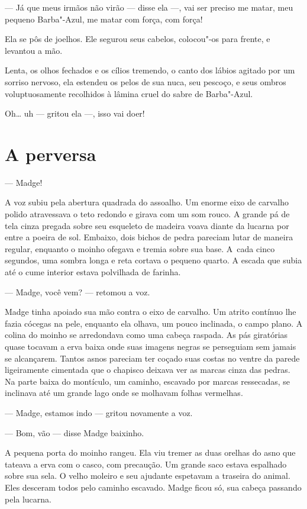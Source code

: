 --- Já que meus irmãos não virão --- disse ela ---, vai ser preciso me matar,
meu pequeno Barba"-Azul, me matar com força, com força!

Ela se pôs de joelhos. Ele segurou seus cabelos, colocou"-os para
frente, e levantou a mão.

Lenta, os olhos fechados e os cílios tremendo, o canto dos lábios
agitado por um sorriso nervoso, ela estendeu os pelos de sua nuca, seu
pescoço, e seus ombros voluptuosamente recolhidos à lâmina cruel do sabre de
Barba"-Azul.

Oh\ldots{} uh --- gritou ela ---, isso vai doer!

\section*{A perversa}

--- Madge!

A voz subiu pela abertura quadrada do assoalho. Um enorme eixo de carvalho
polido atravessava o teto redondo e girava com um som rouco. A grande pá
de tela cinza pregada sobre seu esqueleto de madeira voava diante da
lucarna por entre a poeira de sol. Embaixo, dois bichos de pedra pareciam
lutar de maneira regular, enquanto o moinho ofegava e tremia sobre sua
base. \mbox{A cada} cinco segundos, uma sombra longa e reta cortava o pequeno
quarto. A escada que subia até o cume interior estava polvilhada de
farinha.

--- Madge, você vem? --- retomou a voz.

Madge tinha apoiado sua mão contra o eixo de carvalho. Um atrito
contínuo lhe fazia cócegas na pele, enquanto ela olhava, um pouco
inclinada, o campo plano. A colina do moinho se arredondava como uma
cabeça raspada. As pás giratórias quase tocavam a erva baixa onde suas
imagens negras se perseguiam sem jamais se alcançarem. Tantos asnos
pareciam ter coçado suas costas no ventre da parede ligeiramente cimentada
que o chapisco deixava ver as marcas cinza das pedras. Na parte baixa do
montículo, um caminho, escavado por marcas ressecadas, se inclinava até um
grande lago onde se molhavam folhas vermelhas.

--- Madge, estamos indo --- gritou novamente a voz.

--- Bom, vão --- disse Madge baixinho.

A pequena porta do moinho rangeu. Ela viu tremer as duas orelhas do
asno que tateava a erva com o casco, com precaução. Um grande saco estava
espalhado sobre sua sela. O velho moleiro e seu ajudante espetavam a
traseira do animal. Eles desceram todos pelo caminho escavado. Madge ficou
só, sua cabeça passando pela lucarna.

